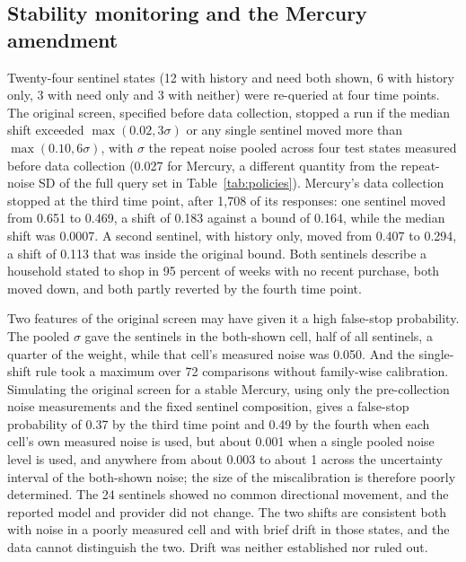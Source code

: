 \documentclass[11pt]{article}
\begin{document}
\subsection{Stability monitoring and the Mercury amendment}
Twenty-four sentinel states (12 with
history and need both shown, 6 with history only, 3 with need only and 3 with neither) were re-queried at
four time points. The original screen, specified before data collection, stopped a run if the median shift
exceeded $\max(0.02,3\sigma)$ or any single sentinel moved more than $\max(0.10,6\sigma)$, with $\sigma$
the repeat noise pooled across four test states measured before data collection (0.027 for
Mercury, a different quantity from the repeat-noise SD of the full query set in
Table~\ref{tab:policies}). Mercury's data collection stopped at the third time point, after 1,708 of its responses: one sentinel moved from 0.651
to 0.469, a shift of 0.183 against a bound of 0.164, while the median shift was 0.0007. A second
sentinel, with history only, moved from 0.407 to 0.294, a shift of 0.113 that was inside the
original bound. Both sentinels describe a household stated to shop in 95 percent of weeks with no
recent purchase, both moved down, and both partly reverted by the fourth time point.

Two features of the original screen may have given it a high false-stop probability. The pooled $\sigma$ gave the sentinels in the both-shown
cell, half of all sentinels, a quarter of the weight, while that cell's measured noise was 0.050. And the
single-shift rule took a maximum over 72 comparisons without family-wise calibration. Simulating the
original screen for a stable Mercury, using only the pre-collection noise measurements and the fixed
sentinel composition, gives a false-stop probability of 0.37 by the third time point and 0.49 by
the fourth when each cell's own measured noise is used, but about 0.001 when a single pooled noise
level is used, and anywhere from about 0.003 to about 1 across the uncertainty interval of the
both-shown noise; the size of the miscalibration is therefore poorly determined. The 24 sentinels
showed no common directional movement, and the reported model and provider did not change. The
two shifts are consistent both with noise in a poorly measured cell and with brief drift in
those states, and the data cannot distinguish the two. Drift was neither established nor ruled
out.
\end{document}

